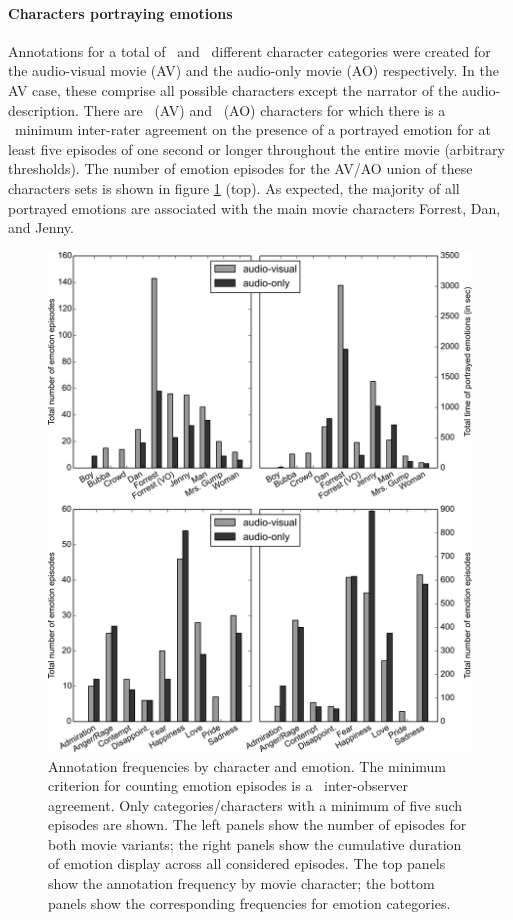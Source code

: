 \documentclass[10pt,a4paper,twocolumn]{article}
\begin{document}
\paragraph{Characters portraying emotions} Annotations for a total of
\AVTotalCharLabels\ and \AOTotalCharLabels\ different character categories were
created for the audio-visual movie (AV) and the audio-only movie (AO)
respectively. In the AV case, these comprise all possible characters except the
narrator of the audio-description. There are \AVThreshCharLabels~(AV) and
\AOThreshCharLabels~(AO) characters for which there is a \AVAggThresh\ minimum
inter-rater agreement on the presence of a portrayed emotion for at least five
episodes of one second or longer throughout the entire movie (arbitrary
thresholds). The number of emotion episodes for the AV/AO union of these
characters sets is shown in figure \ref{fig:threshcharemo} (top). As expected,
the majority of all portrayed emotions are associated with the main movie
characters Forrest, Dan, and Jenny.

\begin{figure}
  \centering
  \includegraphics[width=\linewidth]{figures/ioa_episodes}
  \caption{Annotation frequencies by character and emotion. The minimum
    criterion for counting emotion episodes is a \AVAggThresh\ inter-observer agreement.
    Only categories/characters with a minimum of five such episodes are shown.
    The left panels show the number of episodes for both movie variants; the
    right panels show the cumulative duration of emotion display across all
    considered episodes. The top panels show the annotation frequency by movie
    character; the bottom panels show the corresponding frequencies for emotion
  categories.}
  \label{fig:threshcharemo}
\end{figure}
\end{document}
